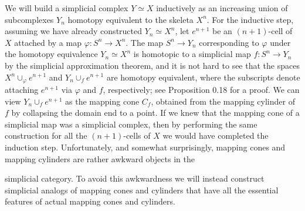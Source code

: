 We will build a simplicial complex $Y \simeq X$ inductively as an increasing union of
subcomplexes $Y_n$ homotopy equivalent to the skeleta $X^n$. For the inductive step,
assuming we have already constructed $Y_n \simeq X^n$, let $e^{n+1}$ be an $(n+1)$-cell of $X$
attached by a map $\varphi : S^n \to X^n$. The map $S^n \to Y_n$ corresponding to $\varphi$ under the
homotopy equivalence $Y_n \simeq X^n$ is homotopic to a simplicial map $f : S^n \to Y_n$ by the
simplicial approximation theorem, and it is not hard to see that the spaces $X^n \cup_\varphi e^{n+1}$
and $Y_n \cup_f e^{n+1}$ are homotopy equivalent, where the subscripts denote attaching $e^{n+1}$
via $\varphi$ and $f$, respectively; see Proposition 0.18 for a proof. We can view $Y_n \cup_f e^{n+1}$
as the mapping cone $C_f$, obtained from the mapping cylinder of $f$ by collapsing the
domain end to a point. If we knew that the mapping cone of a simplicial map was a
simplicial complex, then by performing the same construction for all the $(n+1)$-cells
of $X$ we would have completed the induction step. Unfortunately, and somewhat
surprisingly, mapping cones and mapping cylinders are rather awkward objects in the

simplicial category. To avoid this awkwardness we will instead construct simplicial analogs of mapping cones and cylinders that have all the essential features of actual mapping cones and cylinders.


